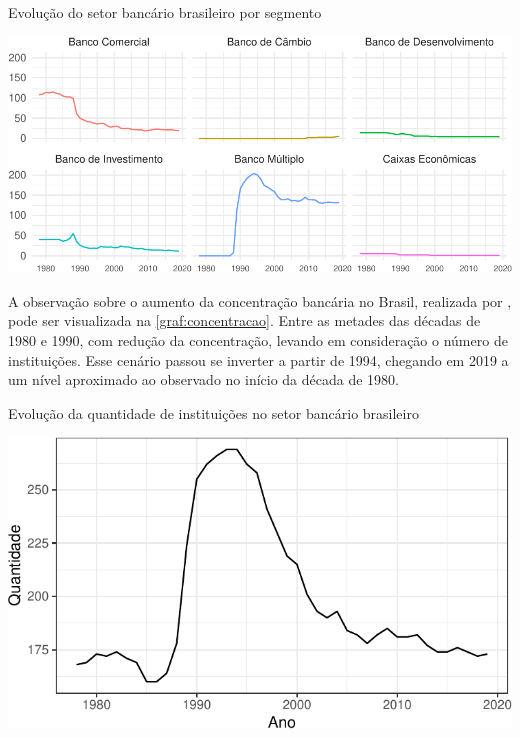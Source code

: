 \documentclass[
  12pt,
  12pt,
  openright,
  oneside,
  a4paper,
  chapter=TITLE,
  section=TITLE,
  subsection=TITLE,
  subsubsection=TITLE,
  english,
  portugues,
  sumario=tradicional]{abntex2}
\begin{document}
\begin{grafico}[!htbp]
\vspace{20pt}
\caption{Evolução do setor bancário brasileiro por segmento}
\vspace{-4mm}

\begin{center}\includegraphics{12-exportedfigures/bank.evolution-1} \end{center}
\vspace{-3mm}
\label{graf:segmento}
\vspace{-2mm}
\end{grafico}

A observação sobre o aumento da concentração bancária no Brasil, realizada por \textcite{camargo:2009}, pode ser visualizada na \autoref{graf:concentracao}. Entre as metades das décadas de 1980 e 1990, com redução da concentração, levando em consideração o número de instituições. Esse cenário passou se inverter a partir de 1994, chegando em 2019 a um nível aproximado ao observado no início da década de 1980.

\begin{grafico}[!hbtp]
\vspace{20pt}
\caption{Evolução da quantidade de instituições no setor bancário brasileiro}
\vspace{-4mm}

\begin{center}\includegraphics{12-exportedfigures/concetration-1} \end{center}
\vspace{-3mm}
\label{graf:concentracao}
\vspace{-2mm}
\end{grafico}
\end{document}
